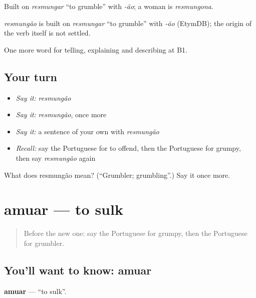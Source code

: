 Built on \emph{resmungar} \textquotedblleft{}to grumble\textquotedblright{} with \emph{-ão}; a woman is \emph{resmungona}.

\begin{cousinweb}
\emph{resmungão} is built on \emph{resmungar} \textquotedblleft{}to grumble\textquotedblright{} with \emph{-ão} (EtymDB); the origin of the verb itself is not settled.
\end{cousinweb}

\begin{grammarlens}[title={What you've built}]
One more word for telling, explaining and describing at B1.
\end{grammarlens}

\subsection*{Your turn}
\begin{itemize}
\raggedright
  \item \emph{Say it:} \emph{resmungão}
  \item \emph{Say it:} \emph{resmungão}, once more
  \item \emph{Say it:} a sentence of your own with \emph{resmungão}
  \item \emph{Recall:} say the Portuguese for to offend, then the Portuguese for grumpy, then say \emph{resmungão} again
\end{itemize}

\begin{tcolorbox}[breakable,colback=teal!4,colframe=teal!35!black,title={Before you move on}]
What does resmungão mean? (\textquotedblleft{}Grumbler; grumbling\textquotedblright{}.) Say it once more.
\end{tcolorbox}
\section[amuar]{amuar — to sulk}

\label{lesson:PT-C474-amuar}



\begin{quote}
Before the new one: say the Portuguese for grumpy, then the Portuguese for grumbler.
\end{quote}

\subsection*{You'll want to know: amuar}
\textbf{amuar} — \textquotedblleft{}to sulk\textquotedblright{}.

